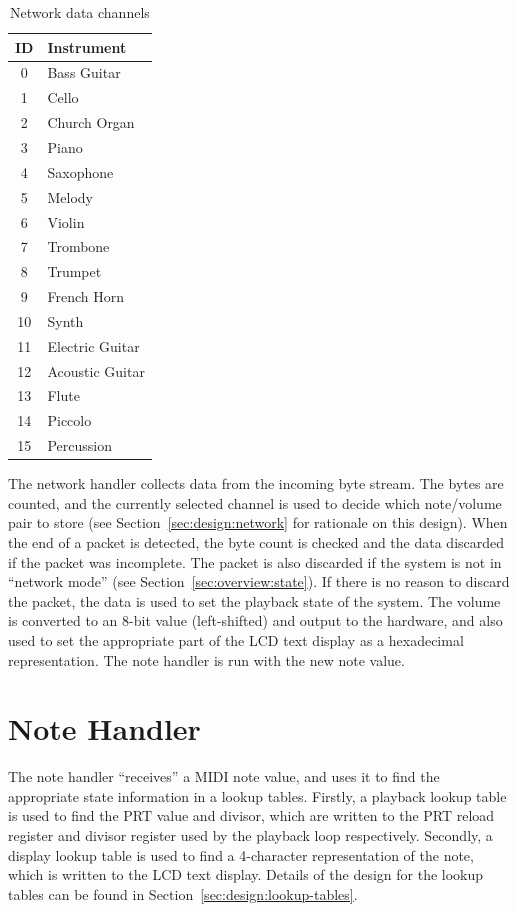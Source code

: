 \begin{nowordcount}
\begin{table}[htbp]
\centering
\begin{tabular}{c | l}
ID & Instrument \\
\hline\hline
0 & Bass Guitar \\
1 & Cello \\
2 & Church Organ \\
3 & Piano \\
4 & Saxophone \\
5 & Melody \\
6 & Violin \\
7 & Trombone \\
8 & Trumpet \\
9 & French Horn \\
10 & Synth \\
11 & Electric Guitar \\
12 & Acoustic Guitar \\
13 & Flute \\
14 & Piccolo \\
15 & Percussion
\end{tabular}
\caption{Network data channels}\label{tab:channelids}
\end{table}
\end{nowordcount}

The network handler collects data from the incoming byte stream.  The bytes are counted, and the 
currently selected channel is used to decide which note/volume pair to store (see 
Section~\ref{sec:design:network} for rationale on this design).  When the end of a packet is 
detected, the byte count is checked and the data discarded if the packet was incomplete.  The packet 
is also discarded if the system is not in ``network mode'' (see Section~\ref{sec:overview:state}).
If there is no reason to discard the packet, the data is used to set the playback state of the 
system.  The volume is converted to an 8-bit value (left-shifted) and output to the hardware, and 
also used to set the appropriate part of the LCD text display as a hexadecimal representation.  The 
note handler is run with the new note value.

\section{Note Handler}
\label{sec:overview:note-handler}

The note handler ``receives'' a MIDI note value, and uses it to find the appropriate state 
information in a lookup tables.  Firstly, a playback lookup table is used to find the PRT value and 
divisor, which are written to the PRT reload register and divisor register used by the playback loop 
respectively.  Secondly, a display lookup table is used to find a 4-character representation of the 
note, which is written to the LCD text display.  Details of the design for the lookup tables can be 
found in Section~\ref{sec:design:lookup-tables}.

